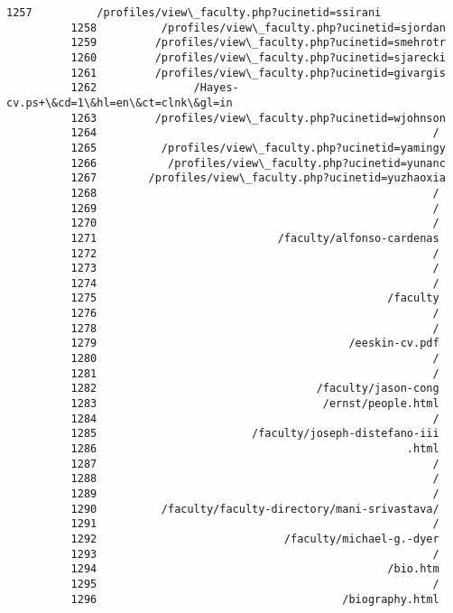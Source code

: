 \documentclass[11pt]{article}
\begin{document}
\begin{Verbatim}[commandchars=\\\{\}]
          1257          /profiles/view\_faculty.php?ucinetid=ssirani
          1258          /profiles/view\_faculty.php?ucinetid=sjordan
          1259         /profiles/view\_faculty.php?ucinetid=smehrotr
          1260         /profiles/view\_faculty.php?ucinetid=sjarecki
          1261         /profiles/view\_faculty.php?ucinetid=givargis
          1262               /Hayes-cv.ps+\&cd=1\&hl=en\&ct=clnk\&gl=in
          1263         /profiles/view\_faculty.php?ucinetid=wjohnson
          1264                                                    /
          1265          /profiles/view\_faculty.php?ucinetid=yamingy
          1266           /profiles/view\_faculty.php?ucinetid=yunanc
          1267        /profiles/view\_faculty.php?ucinetid=yuzhaoxia
          1268                                                    /
          1269                                                    /
          1270                                                    /
          1271                            /faculty/alfonso-cardenas
          1272                                                    /
          1273                                                    /
          1274                                                    /
          1275                                             /faculty
          1276                                                    /
          1278                                                    /
          1279                                       /eeskin-cv.pdf
          1280                                                    /
          1281                                                    /
          1282                                  /faculty/jason-cong
          1283                                   /ernst/people.html
          1284                                                    /
          1285                        /faculty/joseph-distefano-iii
          1286                                                .html
          1287                                                    /
          1288                                                    /
          1289                                                    /
          1290          /faculty/faculty-directory/mani-srivastava/
          1291                                                    /
          1292                             /faculty/michael-g.-dyer
          1293                                                    /
          1294                                             /bio.htm
          1295                                                    /
          1296                                      /biography.html

\end{Verbatim}
\end{document}
